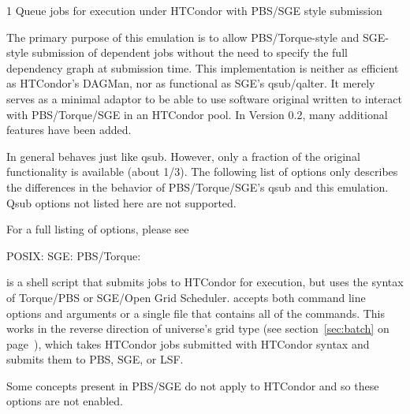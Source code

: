 \begin{ManPage}{\label{man-condor-qsub}}{1}
{Queue jobs for execution under HTCondor with PBS/SGE style submission}
\Synopsis {}


\Description

The primary purpose of this emulation is to allow PBS/Torque-style and 
SGE-style submission of dependent jobs without the need to specify the full
dependency graph at submission time. This implementation is neither as efficient
as HTCondor's DAGMan, nor as functional as SGE's qsub/qalter. It merely serves 
as a minimal adaptor to be able to use software original written to interact 
with PBS/Torque/SGE in an HTCondor pool. In Version 0.2, many additional 
features have been added.

In general  behaves just like qsub. However, only a fraction of the
original functionality is available (about 1/3). The following list of options only
describes the differences in the behavior of PBS/Torque/SGE's qsub and this 
emulation. Qsub options not listed here are not supported.

For a full listing of options, please see
\begin{itemize}
POSIX: 
SGE: 
PBS/Torque: 
\end{itemize}

 is a shell script that submits jobs to HTCondor for execution, but 
uses the syntax of Torque/PBS or SGE/Open Grid Scheduler.  accepts
both command line options and arguments or a single file that contains all of the 
commands. This works in the reverse direction of  universe's 
 grid type (see section~\ref{sec:batch} on 
page~\pageref{sec:batch}), which takes HTCondor jobs submitted with HTCondor
syntax and submits them to PBS, SGE, or LSF.

Some concepts present in PBS/SGE do not apply to HTCondor and so these options are
not enabled.


\end{ManPage}
